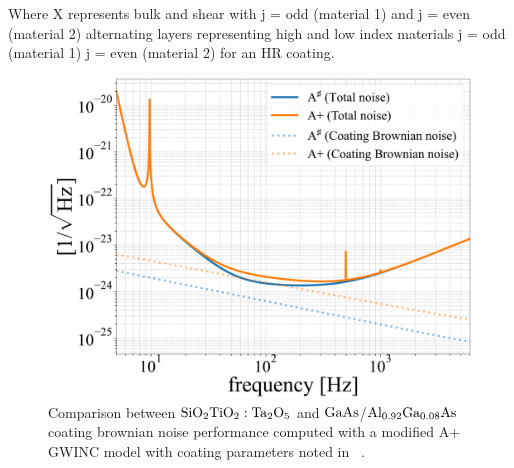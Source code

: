 \noindent Where X represents bulk and shear with j = odd (material 1) and j = even (material 2) alternating layers representing high and low index materials j = odd (material 1) j = even (material 2) for an HR coating.

\begin{figure}[H]
    \begin{center}
    \includegraphics[width=\textwidth]{code/gwinc/aplus_CTN_compare.pdf}
    \end{center}
\caption{Comparison between $\mathrm{SiO_2}\mathrm{TiO_2:Ta_2O_5}$ and $\mathrm{GaAs}$/$\mathrm{Al_{0.92}Ga_{0.08}As}$ coating brownian noise performance computed with a modified A+ GWINC model with coating parameters noted in ~\cite{dcc:asharp}.}
\label{fig:aligotncomp}
\end{figure}

